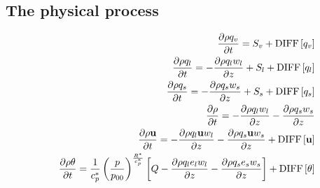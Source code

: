 \subsection{The physical process}
\begin{eqnarray}
&&  \frac{\partial \rho q_v}{\partial t}  = S_v
+{\rm DIFF}\left[q_v \right]
\label{eq:rho_v_p2}\\
&&  \frac{\partial \rho q_l}{\partial t}
= - \frac{\partial \rho q_l w_l}{\partial z}+S_l
+{\rm DIFF}\left[q_l \right]
\label{eq:rho_l_p2}\\
&&  \frac{\partial \rho q_s}{\partial t}
=- \frac{\partial \rho q_s w_s}{\partial z}+S_s
+{\rm DIFF}\left[q_s \right]
\label{eq:rho_s_p2}\\
&&  \frac{\partial \rho}{\partial t}
=- \frac{\partial \rho q_l w_l}{\partial z}
 - \frac{\partial \rho q_s w_s}{\partial z}
 \label{eq:rhotot_p2}\\
&&  \frac{\partial \rho {\bf u}}{\partial t}
= 
- \frac{\partial \rho q_l {\bf u} w_l}{\partial z}
- \frac{\partial \rho q_s {\bf u} w_s}{\partial z}
+{\rm DIFF}\left[{\bf u} \right] 
 \label{eq:momtot_p2}\\
&&  \frac{\partial \rho \theta  }{\partial t}
=  \frac{1}{c_p^*} \left(\frac{p}{p_{00}}\right)^{\frac{R^*}{c_p^*}}
\left[Q
 - \frac{\partial \rho q_l e_l w_l}{\partial z}
 - \frac{\partial \rho q_s e_s w_s}{\partial z}
\right]
 + {\rm DIFF}\left[\theta \right] \label{eq:etot_p2}
\end{eqnarray}

